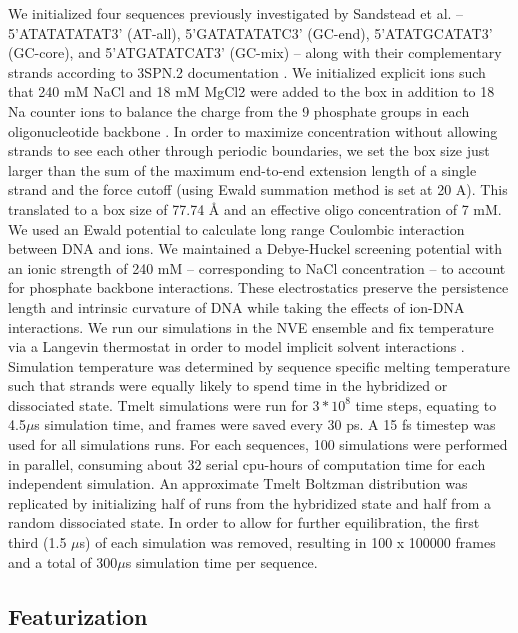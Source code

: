 \documentclass[journal=jpcbfk,manuscript=article]{achemso}
\begin{document}
We initialized four sequences previously investigated by Sandstead et al. -- 5'ATATATATAT3' (AT-all), 5'GATATATATC3' (GC-end), 5'ATATGCATAT3' (GC-core), and 5'ATGATATCAT3' (GC-mix) -- along with their complementary strands according to 3SPN.2 documentation \citep{Sanstead2016, Phys2014}. We initialized explicit ions such that 240 mM NaCl and 18 mM MgCl2 were added to the box in addition to 18 Na counter ions to balance the charge from the 9 phosphate groups in each oligonucleotide backbone \citep{Hinckley2015}. In order to maximize concentration without allowing strands to see each other through periodic boundaries, we set the box size just larger than the sum of the maximum end-to-end extension length of a single strand and the force cutoff (using Ewald summation method is set at 20 A). This translated to a box size of 77.74 Å and an effective oligo concentration of 7 mM. We used an Ewald potential to calculate long range Coulombic interaction between DNA and ions. We maintained a Debye-Huckel screening potential with an ionic strength of 240 mM -- corresponding to NaCl concentration -- to account for phosphate backbone interactions. These electrostatics preserve the persistence length and intrinsic curvature of DNA while taking the effects of ion-DNA interactions\citep{Hinckley2015}. We run our simulations in the NVE ensemble and fix temperature via a Langevin thermostat in order to model implicit solvent interactions \citep{Schneider1978Molecular-dynamicsTransitions}. Simulation temperature was determined by sequence specific melting temperature such that strands were equally likely to spend time in the hybridized or dissociated state. Tmelt simulations were run for $3*10^{8}$ time steps, equating to 4.5$\mu$s simulation time, and frames were saved every 30 ps. A 15 fs timestep was used for all simulations runs. For each sequences, 100 simulations were performed in parallel, consuming about 32 serial cpu-hours of computation time for each independent simulation. An approximate Tmelt Boltzman distribution was replicated by initializing half of runs from the hybridized state and half from a random dissociated state. In order to allow for further equilibration, the first third (1.5 $\mu$s) of each simulation was removed, resulting in 100 x 100000 frames and a total of 300$\mu$s simulation time per sequence.

\subsection{\label{sec:methods}Featurization}
\end{document}
